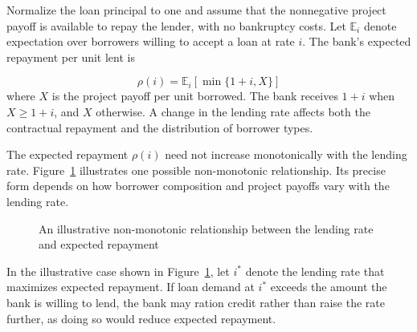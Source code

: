 Normalize the loan principal to one and assume that the nonnegative project payoff is available to repay the lender, with no bankruptcy costs. Let \(\mathbb{E}_i\) denote expectation over borrowers willing to accept a loan at rate \(i\). The bank's expected repayment per unit lent is

\begin{equation}
\rho(i)=\mathbb{E}_i[\min\{1+i,X\}]
\label{eq:ch3-bank-return}
\end{equation}
where $X$ is the project payoff per unit borrowed. The bank receives $1+i$ when $X\geq 1+i$, and $X$ otherwise. A change in the lending rate affects both the contractual repayment
and the distribution of borrower types. 

The expected repayment $\rho(i)$ need not increase monotonically with the lending rate. Figure~\ref{fig:ch3-credit-rationing} illustrates one possible non-monotonic relationship. Its precise form depends on how borrower composition and project payoffs vary with the lending rate.

\begin{figure}[H]
\centering


\caption{An illustrative non-monotonic relationship
between the lending rate and expected repayment}
\label{fig:ch3-credit-rationing}
\end{figure}


In the illustrative case shown in Figure~\ref{fig:ch3-credit-rationing}, let $i^*$ denote the lending rate that maximizes expected repayment. If loan demand at $i^*$ exceeds the amount the bank is willing to lend, the bank may ration credit rather than raise the rate further, as doing so would reduce expected repayment.


